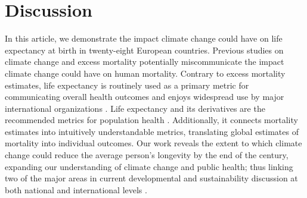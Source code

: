 \documentclass[12pt,]{article}
\begin{document}
\hypertarget{discussion}{%
\section{Discussion}\label{discussion}}

In this article, we demonstrate the impact climate change could have on
life expectancy at birth in twenty-eight European countries. Previous
studies on climate change and excess mortality potentially
miscommunicate the impact climate change could have on human mortality.
Contrary to excess mortality estimates, life expectancy is routinely
used as a primary metric for communicating overall health outcomes and
enjoys widespread use by major international organizations
\citep{world2015world, marmot2012building, salomon2012healthy}. Life
expectancy and its derivatives are the recommended metrics for
population health \citep{parrish2010peer}. Additionally, it connects
mortality estimates into intuitively understandable metrics, translating
global estimates of mortality into individual outcomes. Our work reveals
the extent to which climate change could reduce the average person's
longevity by the end of the century, expanding our understanding of
climate change and public health; thus linking two of the major areas in
current developmental and sustainability discussion at both national and
international levels \citep{abel2016meeting}.
\end{document}

